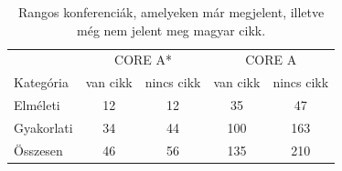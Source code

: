 \begin{table}[h]
  \centering
  \caption{Rangos konferenciák, amelyeken már megjelent, illetve még nem jelent meg magyar cikk.}
  \label{tab:conference_pies_summary}
  \begin{tabular}{l|cc|cc}
    \toprule
     & \multicolumn{2}{c|}{CORE A*} & \multicolumn{2}{c}{CORE A} \\
    Kategória & van cikk & nincs cikk & van cikk & nincs cikk \\
    \midrule
    Elméleti & 12 & 12 & 35 & 47 \\
    Gyakorlati & 34 & 44 & 100 & 163 \\
    \midrule
    Összesen & 46 & 56 & 135 & 210 \\
    \bottomrule
  \end{tabular}
\end{table}